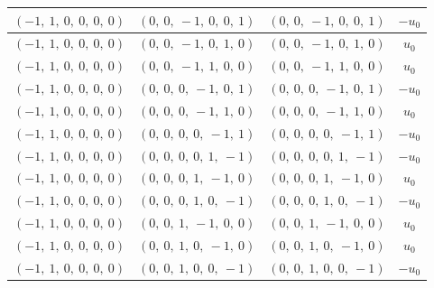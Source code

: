 \documentclass[11pt]{article}
\theoremstyle{definition}
\begin{document}
\begin{longtable}{|l|l|l|c|}
    \hline
    $\left( -1, \  1, \  0, \  0, \  0, \  0\right)$ & $\left( 0, \  0, \  -1, \  0, \  0, \  1\right)$ & $\left( 0, \  0, \  -1, \  0, \  0, \  1\right)$ & $- u_{0}$ \\
    \hline
    $\left( -1, \  1, \  0, \  0, \  0, \  0\right)$ & $\left( 0, \  0, \  -1, \  0, \  1, \  0\right)$ & $\left( 0, \  0, \  -1, \  0, \  1, \  0\right)$ & $u_{0}$ \\
    \hline
    $\left( -1, \  1, \  0, \  0, \  0, \  0\right)$ & $\left( 0, \  0, \  -1, \  1, \  0, \  0\right)$ & $\left( 0, \  0, \  -1, \  1, \  0, \  0\right)$ & $u_{0}$ \\
    \hline
    $\left( -1, \  1, \  0, \  0, \  0, \  0\right)$ & $\left( 0, \  0, \  0, \  -1, \  0, \  1\right)$ & $\left( 0, \  0, \  0, \  -1, \  0, \  1\right)$ & $- u_{0}$ \\
    \hline
    $\left( -1, \  1, \  0, \  0, \  0, \  0\right)$ & $\left( 0, \  0, \  0, \  -1, \  1, \  0\right)$ & $\left( 0, \  0, \  0, \  -1, \  1, \  0\right)$ & $u_{0}$ \\
    \hline
    $\left( -1, \  1, \  0, \  0, \  0, \  0\right)$ & $\left( 0, \  0, \  0, \  0, \  -1, \  1\right)$ & $\left( 0, \  0, \  0, \  0, \  -1, \  1\right)$ & $- u_{0}$ \\
    \hline
    $\left( -1, \  1, \  0, \  0, \  0, \  0\right)$ & $\left( 0, \  0, \  0, \  0, \  1, \  -1\right)$ & $\left( 0, \  0, \  0, \  0, \  1, \  -1\right)$ & $- u_{0}$ \\
    \hline
    $\left( -1, \  1, \  0, \  0, \  0, \  0\right)$ & $\left( 0, \  0, \  0, \  1, \  -1, \  0\right)$ & $\left( 0, \  0, \  0, \  1, \  -1, \  0\right)$ & $u_{0}$ \\
    \hline
    $\left( -1, \  1, \  0, \  0, \  0, \  0\right)$ & $\left( 0, \  0, \  0, \  1, \  0, \  -1\right)$ & $\left( 0, \  0, \  0, \  1, \  0, \  -1\right)$ & $- u_{0}$ \\
    \hline
    $\left( -1, \  1, \  0, \  0, \  0, \  0\right)$ & $\left( 0, \  0, \  1, \  -1, \  0, \  0\right)$ & $\left( 0, \  0, \  1, \  -1, \  0, \  0\right)$ & $u_{0}$ \\
    \hline
    $\left( -1, \  1, \  0, \  0, \  0, \  0\right)$ & $\left( 0, \  0, \  1, \  0, \  -1, \  0\right)$ & $\left( 0, \  0, \  1, \  0, \  -1, \  0\right)$ & $u_{0}$ \\
    \hline
    $\left( -1, \  1, \  0, \  0, \  0, \  0\right)$ & $\left( 0, \  0, \  1, \  0, \  0, \  -1\right)$ & $\left( 0, \  0, \  1, \  0, \  0, \  -1\right)$ & $- u_{0}$ \\

\end{longtable}
\end{document}
